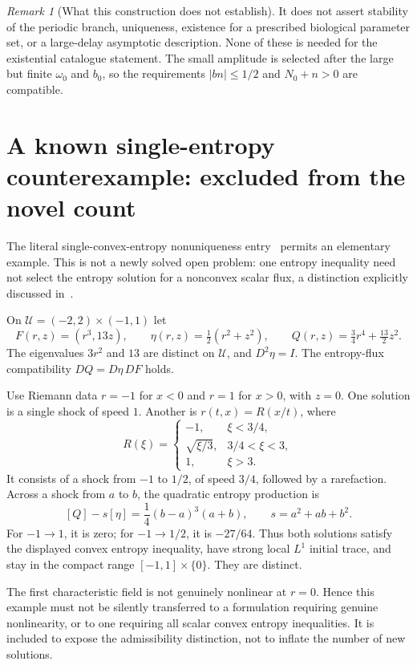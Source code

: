 \documentclass[11pt,a4paper]{article}
\numberwithin{equation}{section}
\theoremstyle{remark}\newtheorem{remark}[theorem]{Remark}
\begin{document}
\begin{remark}[What this construction does not establish]
It does not assert stability of the periodic branch, uniqueness, existence for a prescribed biological parameter set, or a large-delay asymptotic description. None of these is needed for the existential catalogue statement. The small amplitude is selected after the large but finite $\omega_0$ and $b_0$, so the requirements $|b n|\leq1/2$ and $N_0+n>0$ are compatible.
\end{remark}

\newpage
\section{A known single-entropy counterexample: excluded from the novel count}
The literal single-convex-entropy nonuniqueness entry~\cite{entropyentry} permits an elementary example. This is not a newly solved open problem: one entropy inequality need not select the entropy solution for a nonconvex scalar flux, a distinction explicitly discussed in~\cite{lefran}.

On $\mathcal U=(-2,2)\times(-1,1)$ let
\[
 F(r,z)=(r^3,13z),\qquad
 \eta(r,z)=\tfrac12(r^2+z^2),\qquad
 Q(r,z)=\tfrac34r^4+\tfrac{13}{2}z^2.
\]
The eigenvalues $3r^2$ and $13$ are distinct on $\mathcal U$, and $D^2\eta=I$. The entropy-flux compatibility $DQ=D\eta\,DF$ holds.

Use Riemann data $r=-1$ for $x<0$ and $r=1$ for $x>0$, with $z=0$. One solution is a single shock of speed $1$. Another is $r(t,x)=R(x/t)$, where
\[
 R(\xi)=
 \begin{cases}
 -1,&\xi<3/4,\\
 \sqrt{\xi/3},&3/4<\xi<3,\\
 1,&\xi>3.
 \end{cases}
\]
It consists of a shock from $-1$ to $1/2$, of speed $3/4$, followed by a rarefaction. Across a shock from $a$ to $b$, the quadratic entropy production is
\[
 [Q]-s[\eta]=\frac14(b-a)^3(a+b),\qquad s=a^2+ab+b^2.
\]
For $-1\to1$, it is zero; for $-1\to1/2$, it is $-27/64$. Thus both solutions satisfy the displayed convex entropy inequality, have strong local $L^1$ initial trace, and stay in the compact range $[-1,1]\times\{0\}$. They are distinct.

The first characteristic field is not genuinely nonlinear at $r=0$. Hence this example must not be silently transferred to a formulation requiring genuine nonlinearity, or to one requiring all scalar convex entropy inequalities. It is included to expose the admissibility distinction, not to inflate the number of new solutions.
\end{document}
